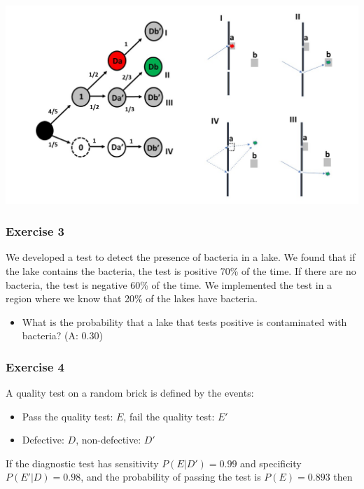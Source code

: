 \documentclass[
]{book}
\providecommand{\tightlist}{%
  \setlength{\itemsep}{0pt}\setlength{\parskip}{0pt}}
\begin{document}
\includegraphics{./figures/quantum.jpg}

\hypertarget{exercise-3-1}{%
\subsubsection{Exercise 3}\label{exercise-3-1}}

We developed a test to detect the presence of bacteria in a lake. We found that if the lake contains the bacteria, the test is positive 70\% of the time. If there are no bacteria, the test is negative 60\% of the time. We implemented the test in a region where we know that 20\% of the lakes have bacteria.

\begin{itemize}
\tightlist
\item
  What is the probability that a lake that tests positive is contaminated with bacteria? (A: 0.30)
\end{itemize}

\hypertarget{exercise-4-1}{%
\subsubsection{Exercise 4}\label{exercise-4-1}}

A quality test on a random brick is defined by the events:

\begin{itemize}
\tightlist
\item
  Pass the quality test: \(E\), fail the quality test: \(E'\)
\item
  Defective: \(D\), non-defective: \(D'\)
\end{itemize}

If the diagnostic test has sensitivity \(P(E|D')= 0.99\) and specificity \(P(E'|D)=0.98\), and the probability of passing the test is \(P(E) =0.893\) then
\end{document}
